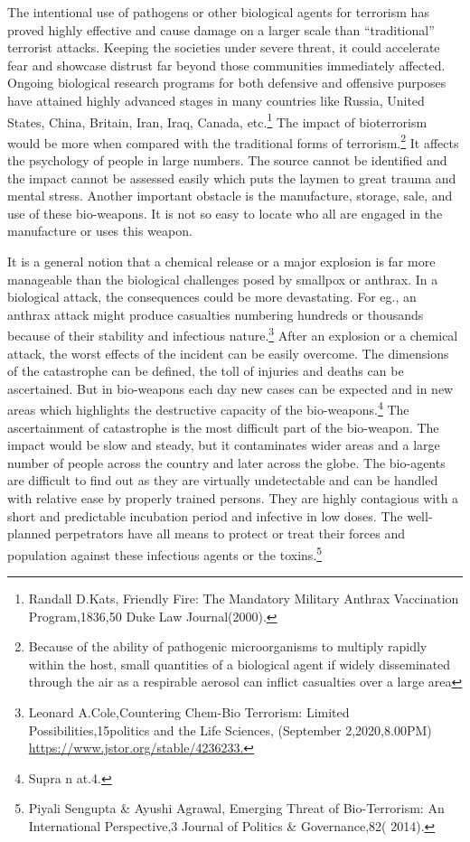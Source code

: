 \begin{multicols}{2}
\noi
The intentional use of pathogens or other biological agents for terrorism has proved highly
effective and cause damage on a larger scale than “traditional” terrorist attacks. Keeping the
societies under severe threat, it could accelerate fear and showcase distrust far beyond those
communities immediately affected. Ongoing biological research programs for both defensive
and offensive purposes have attained highly advanced stages in many countries like Russia,
United States, China, Britain, Iran, Iraq, Canada, etc.\footnote{Randall D.Kats, Friendly Fire: The Mandatory Military Anthrax Vaccination Program,1836,50 Duke Law
Journal(2000).} The impact of bioterrorism would be
more when compared with the traditional forms of terrorism.\footnote{Because of the ability of pathogenic microorganisms to multiply rapidly within the host, small quantities of a biological agent if widely disseminated through the air as a respirable aerosol can inflict casualties over a large
area}  It affects the psychology of
people in large numbers. The source cannot be identified and the impact cannot be assessed
easily which puts the laymen to great trauma and mental stress. Another important obstacle is
the manufacture, storage, sale, and use of these bio-weapons. It is not so easy to locate who
all are engaged in the manufacture or uses this weapon.

\noi
It is a general notion that a chemical release or a major explosion is far more manageable
than the biological challenges posed by smallpox or anthrax. In a biological attack, the
consequences could be more devastating. For eg., an anthrax attack might produce casualties
numbering hundreds or thousands because of their stability and infectious nature.\footnote{Leonard A.Cole,Countering Chem-Bio Terrorism: Limited Possibilities,15politics and the Life Sciences,
(September 2,2020,8.00PM) \url{https://www.jstor.org/stable/4236233.}} After an
explosion or a chemical attack, the worst effects of the incident can be easily overcome. The
dimensions of the catastrophe can be defined, the toll of injuries and deaths can be
ascertained. But in bio-weapons each day new cases can be expected and in new areas which 
highlights the destructive capacity of the bio-weapons.\footnote{Supra n at.4.} The ascertainment of catastrophe is
the most difficult part of the bio-weapon. The impact would be slow and steady, but it
contaminates wider areas and a large number of people across the country and later across the
globe. The bio-agents are difficult to find out as they are virtually undetectable and can be
handled with relative ease by properly trained persons. They are highly contagious with a
short and predictable incubation period and infective in low doses. The well-planned
perpetrators have all means to protect or treat their forces and population against these
infectious agents or the toxins.\footnote{Piyali Sengupta \& Ayushi Agrawal, Emerging Threat of Bio-Terrorism: An International Perspective,3 Journal of Politics \& Governance,82( 2014).}


\end{multicols}
